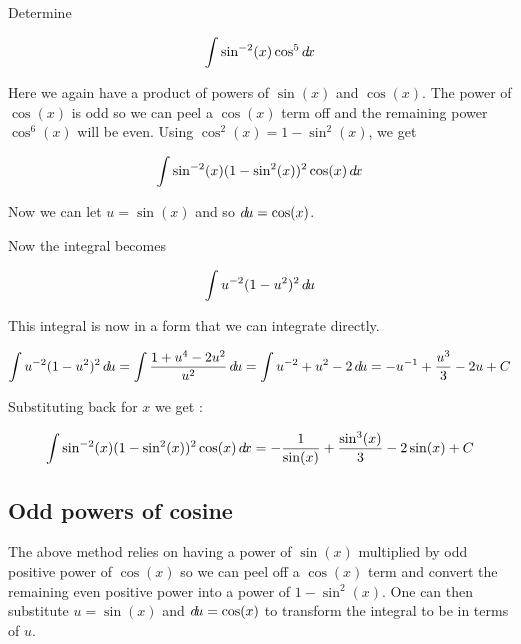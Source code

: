 \documentclass{ximera}
\begin{document}
\begin{example}
Determine 

\[
\int \sin^{-2}(x)\cos^{5} \mathop{}\!d\! x
\]

\begin{explanation}
Here we again have a product of powers of $\sin(x)$ and $\cos(x)$. The power of $\cos(x)$ is odd so we can peel a $\cos(x)$ term off and the remaining power $\cos^{6}(x)$ will be even. Using $\cos^{2}(x)=1-\sin^{2}(x)$, we get

\[
\int \sin^{-2}(x) (1-\sin^{2}(x))^{2} \cos(x) \mathop{}\!d\! x
\]

Now we can let $u=\sin(x)$ and so $\mathop{}\!d\! u= \cos(x)$. 

Now the integral becomes 

\[
\int u^{-2}(1-u^{2})^{2} \mathop{}\!d\! u
\]

This integral is now in a form that we can integrate directly. 

\[
\int u^{-2}(1-u^{2})^{2} \mathop{}\!d\! u=\int \frac{1+u^{4}-2u^{2}}{u^{2}} \mathop{}\!d\! u= \int u^{-2}+u^{2} -2 \mathop{}\!d\! u=-u^{-1}+\frac{u^{3}}{3} -2u + C
\]

Substituting back for $x$ we get :

\[
\int \sin^{-2}(x) ( 1- \sin^{2}(x))^{2} \cos(x) \mathop{}\!d\! x= -\frac{1}{\sin(x)}+ \frac{ \sin^{3}(x)}{3} -2 \sin(x) +C
\]



\end{explanation}

\end{example}

\subsection{Odd powers of cosine}

The above method relies on having a power of $\sin(x)$ multiplied by odd positive power of $\cos(x)$ so we can peel off a $\cos(x)$ term and convert the remaining even positive power into a power of $1-\sin^{2}(x)$. One can then substitute $u=\sin(x)$ and $\mathop{}\!d\! u= \cos(x)$ to transform the integral to be in terms of $u$. 
\end{document}
